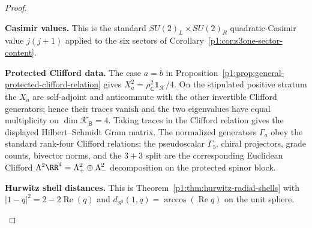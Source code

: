 \documentclass[11pt]{article}
\begin{document}
\begin{proof}

\begin{proofsteps}[label=\textbf{(\roman*)}]
\item \textbf{Casimir values.}
This is the standard \(SU(2)_L\times SU(2)_R\) quadratic-Casimir value
\(j(j+1)\) applied to the six sectors of
Corollary~\ref{p1:cor:s3one-sector-content}.

\item \textbf{Protected Clifford data.}
The case \(a=b\) in
Proposition~\ref{p1:prop:general-protected-clifford-relation} gives
\(X_a^2=\rho_{\mathsf C}^2\mathbf1_{\mathcal K}/4\).  On the stipulated
positive stratum the \(X_a\) are self-adjoint and anticommute with the other
invertible Clifford generators; hence their traces vanish and the two eigenvalues have
equal multiplicity on \(\dim\mathcal K_{\mathsf B}=4\). Taking traces in the
Clifford relation gives the displayed Hilbert--Schmidt Gram matrix. The
normalized generators \(\Gamma_a\) obey the standard rank-four Clifford
relations; the pseudoscalar \(\Gamma_5\), chiral projectors, grade counts,
bivector norms, and the \(3+3\) split are the corresponding Euclidean Clifford
\(\Lambda^2\RR^4=\Lambda^2_+\oplus\Lambda^2_-\) decomposition on the protected
spinor block.

\item \textbf{Hurwitz shell distances.}
This is Theorem~\ref{p1:thm:hurwitz-radial-shells} with
\(|1-q|^2=2-2\operatorname{Re}(q)\) and
\(d_{S^3}(1,q)=\arccos(\operatorname{Re}q)\) on the unit sphere.


\end{proofsteps}
\end{proof}
\end{document}
